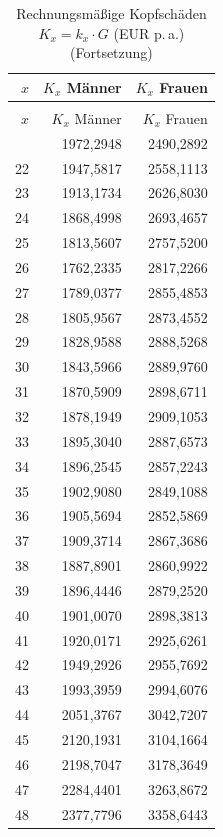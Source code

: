 \begin{small}
\begin{longtable}{rrr}
\caption{Rechnungsmäßige Kopfschäden $K_x = k_x \cdot G$ (EUR p.\,a.)}\label{tab:Kx}\\
\toprule
$x$ & $K_x$ Männer & $K_x$ Frauen \\
\midrule
\endfirsthead
\caption[]{Rechnungsmäßige Kopfschäden $K_x = k_x \cdot G$ (EUR p.\,a.) (Fortsetzung)}\\
\toprule
$x$ & $K_x$ Männer & $K_x$ Frauen \\
\midrule
\endhead
\bottomrule
\endfoot
21 & 1972,2948 & 2490,2892 \\
22 & 1947,5817 & 2558,1113 \\
23 & 1913,1734 & 2626,8030 \\
24 & 1868,4998 & 2693,4657 \\
25 & 1813,5607 & 2757,5200 \\
26 & 1762,2335 & 2817,2266 \\
27 & 1789,0377 & 2855,4853 \\
28 & 1805,9567 & 2873,4552 \\
29 & 1828,9588 & 2888,5268 \\
30 & 1843,5966 & 2889,9760 \\
31 & 1870,5909 & 2898,6711 \\
32 & 1878,1949 & 2909,1053 \\
33 & 1895,3040 & 2887,6573 \\
34 & 1896,2545 & 2857,2243 \\
35 & 1902,9080 & 2849,1088 \\
36 & 1905,5694 & 2852,5869 \\
37 & 1909,3714 & 2867,3686 \\
38 & 1887,8901 & 2860,9922 \\
39 & 1896,4446 & 2879,2520 \\
40 & 1901,0070 & 2898,3813 \\
41 & 1920,0171 & 2925,6261 \\
42 & 1949,2926 & 2955,7692 \\
43 & 1993,3959 & 2994,6076 \\
44 & 2051,3767 & 3042,7207 \\
45 & 2120,1931 & 3104,1664 \\
46 & 2198,7047 & 3178,3649 \\
47 & 2284,4401 & 3263,8672 \\
48 & 2377,7796 & 3358,6443 \\

\end{longtable}
\end{small}
